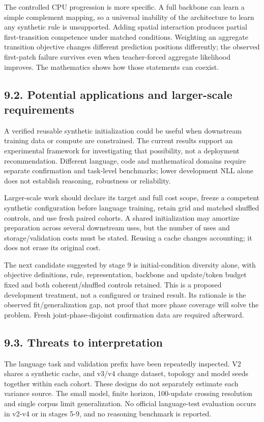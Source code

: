 \documentclass[11pt,a4paper]{article}
\begin{document}
The controlled CPU progression is more specific. A full backbone can learn a simple complement mapping, so a universal inability of the architecture to learn any synthetic rule is unsupported. Adding spatial interaction produces partial first-transition competence under matched conditions. Weighting an aggregate transition objective changes different prediction positions differently; the observed first-patch failure survives even when teacher-forced aggregate likelihood improves. The mathematics shows how those statements can coexist.

\subsection*{9.2. Potential applications and larger-scale requirements}
A verified reusable synthetic initialization could be useful when downstream training data or compute are constrained. The current results support an experimental framework for investigating that possibility, not a deployment recommendation. Different language, code and mathematical domains require separate confirmation and task-level benchmarks; lower development NLL alone does not establish reasoning, robustness or reliability.

Larger-scale work should declare its target and full cost scope, freeze a competent synthetic configuration before language training, retain grid and matched shuffled controls, and use fresh paired cohorts. A shared initialization may amortize preparation across several downstream uses, but the number of uses and storage/\allowbreak{}validation costs must be stated. Reusing a cache changes accounting; it does not erase its original cost.

The next candidate suggested by stage 9 is initial-condition diversity alone, with objective definitions, rule, representation, backbone and update/\allowbreak{}token budget fixed and both coherent/\allowbreak{}shuffled controls retained. This is a proposed development treatment, not a configured or trained result. Its rationale is the observed fit/\allowbreak{}generalization gap, not proof that more phase coverage will solve the problem. Fresh joint-phase-disjoint confirmation data are required afterward.

\subsection*{9.3. Threats to interpretation}
The language task and validation prefix have been repeatedly inspected. V2 shares a synthetic cache, and v3/\allowbreak{}v4 change dataset, topology and model seeds together within each cohort. These designs do not separately estimate each variance source. The small model, finite horizon, 100-update crossing resolution and single corpus limit generalization. No official language-test evaluation occurs in v2-v4 or in stages 5-9, and no reasoning benchmark is reported.
\end{document}
